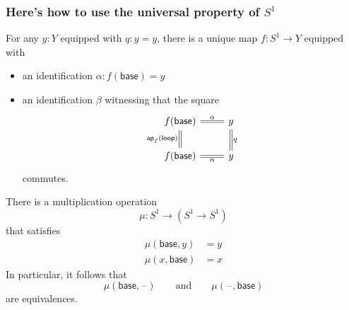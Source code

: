 \documentclass[handout]{beamer}
\newcommand{\sphere}[1]{S^{#1}}
\newcommand{\ap}{\mathsf{ap}}
\newcommand{\blank}{\mathord{\hspace{1pt}\text{--}\hspace{1pt}}}
\newcommand{\baseS}{\mathsf{base}}
\newcommand{\loopS}{\mathsf{loop}}
\newcommand{\apply}[2]{#1(#2)}
\begin{document}
\begin{frame}
  \frametitle{Here's how to use the universal property of $\sphere{1}$}
  For any $y:Y$ equipped with $q:y=y$, there is a unique map $f:\sphere{1}\to Y$ equipped with
  \begin{itemize}
  \item an identification $\alpha:\apply{f}{\baseS}=y$
  \item an identification $\beta$ witnessing that the square
    \begin{equation*}
      \begin{tikzcd}[ampersand replacement=\&]
        \apply{f}{\baseS} \arrow[d,equals,swap,"\apply{\ap_f}{\loopS}"] \arrow[r,equals,"\alpha"] \& y \arrow[d,equals,"q"] \\
        \apply{f}{\baseS} \arrow[r,swap,equals,"\alpha"] \& y
      \end{tikzcd}
    \end{equation*}
    commutes.
  \end{itemize}
\end{frame}

\begin{frame}
  \begin{theorem}
    There is a multiplication operation
    \begin{equation*}
      \mu : \sphere{1}\to(\sphere{1}\to\sphere{1})
    \end{equation*}
    that satisfies
    \begin{align*}
      \apply{\mu}{\baseS,y} & = y \\
      \apply{\mu}{x,\baseS} & = x
    \end{align*}
    In particular, it follows that
    \begin{equation*}
      \apply{\mu}{\baseS,\blank} \qquad\text{and}\qquad\apply{\mu}{\blank,\baseS}
    \end{equation*}
    are equivalences.
  \end{theorem}
\end{frame}
\end{document}

